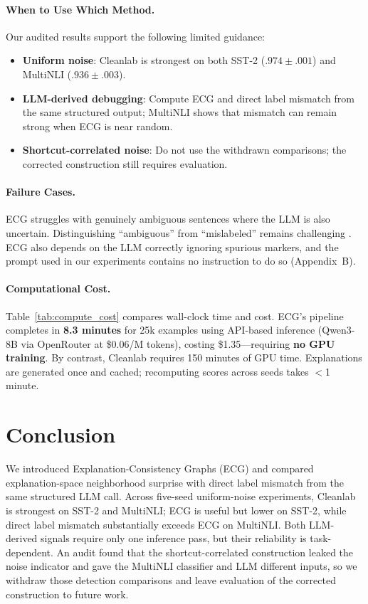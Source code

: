 \documentclass[letterpaper]{article}
\begin{document}
\paragraph{When to Use Which Method.}
Our audited results support the following limited guidance:
\begin{itemize}
    \item \textbf{Uniform noise}: Cleanlab is strongest on both SST-2 ($.974 \pm .001$) and MultiNLI ($.936 \pm .003$).
    \item \textbf{LLM-derived debugging}: Compute ECG and direct label mismatch from the same structured output; MultiNLI shows that mismatch can remain strong when ECG is near random.
    \item \textbf{Shortcut-correlated noise}: Do not use the withdrawn comparisons; the corrected construction still requires evaluation.
\end{itemize}

\paragraph{Failure Cases.}
ECG struggles with genuinely ambiguous sentences where the LLM is also uncertain.
Distinguishing ``ambiguous'' from ``mislabeled'' remains challenging \citep{maini2022second}.
ECG also depends on the LLM correctly ignoring spurious markers, and the prompt used in our experiments contains no instruction to do so (Appendix~B).

\paragraph{Computational Cost.}
Table~\ref{tab:compute_cost} compares wall-clock time and cost.
ECG's pipeline completes in \textbf{8.3 minutes} for 25k examples using API-based inference (Qwen3-8B via OpenRouter at \$0.06/M tokens), costing \$1.35---requiring \textbf{no GPU training}.
By contrast, Cleanlab requires 150 minutes of GPU time.
Explanations are generated once and cached; recomputing scores across seeds takes $<$1 minute.

\section{Conclusion}
\label{sec:conclusion}

We introduced Explanation-Consistency Graphs (ECG) and compared explanation-space neighborhood surprise with direct label mismatch from the same structured LLM call.
Across five-seed uniform-noise experiments, Cleanlab is strongest on SST-2 and MultiNLI; ECG is useful but lower on SST-2, while direct label mismatch substantially exceeds ECG on MultiNLI.
Both LLM-derived signals require only one inference pass, but their reliability is task-dependent.
An audit found that the shortcut-correlated construction leaked the noise indicator and gave the MultiNLI classifier and LLM different inputs, so we withdraw those detection comparisons and leave evaluation of the corrected construction to future work.
\end{document}
